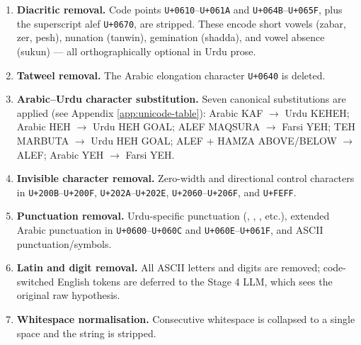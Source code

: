 \begin{enumerate}
 \item \textbf{Diacritic removal.} Code points \texttt{U+0610}--\texttt{U+061A} and \texttt{U+064B}--\texttt{U+065F}, plus the superscript alef \texttt{U+0670}, are stripped. These encode short vowels (zabar, zer, pesh), nunation (tanwin), gemination (shadda), and vowel absence (sukun) --- all orthographically optional in Urdu prose.
 \item \textbf{Tatweel removal.} The Arabic elongation character \texttt{U+0640} is deleted.
 \item \textbf{Arabic--Urdu character substitution.} Seven canonical substitutions are applied (see Appendix \ref{app:unicode-table}): Arabic KAF $\to$ Urdu KEHEH; Arabic HEH $\to$ Urdu HEH GOAL; ALEF MAQSURA $\to$ Farsi YEH; TEH MARBUTA $\to$ Urdu HEH GOAL; ALEF + HAMZA ABOVE/BELOW $\to$ ALEF; Arabic YEH $\to$ Farsi YEH.
 \item \textbf{Invisible character removal.} Zero-width and directional control characters in \texttt{U+200B}--\texttt{U+200F}, \texttt{U+202A}--\texttt{U+202E}, \texttt{U+2060}--\texttt{U+206F}, and \texttt{U+FEFF}.
 \item \textbf{Punctuation removal.} Urdu-specific punctuation (\texttt{}, \texttt{}, \texttt{}, etc.), extended Arabic punctuation in \texttt{U+0600}--\texttt{U+060C} and \texttt{U+060E}--\texttt{U+061F}, and ASCII punctuation/symbols.
 \item \textbf{Latin and digit removal.} All ASCII letters and digits are removed; code-switched English tokens are deferred to the Stage 4 LLM, which sees the original raw hypothesis.
 \item \textbf{Whitespace normalisation.} Consecutive whitespace is collapsed to a single space and the string is stripped.
\end{enumerate}

